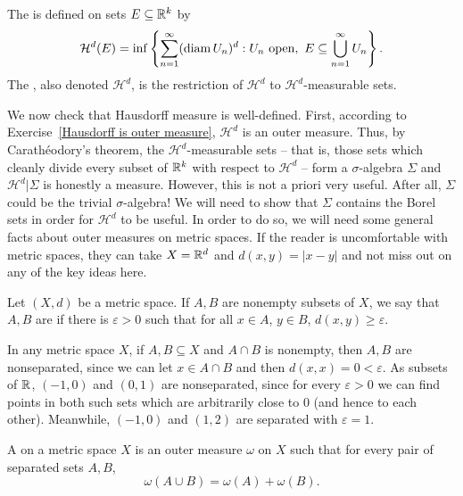 \begin{definition}
The  is defined on sets $E \subseteq \mathbb{R}^k$ by
$$\mathcal H^d(E) = \inf\left\{\sum_{n=1}^\infty (\operatorname{diam} U_{n})^d: U_{n}~\text{open},~E \subseteq \bigcup_{n=1}^\infty U_{n}\right\}.$$
The , also denoted $\mathcal H^d$, is the restriction of $\mathcal H^d$ to $\mathcal H^d$-measurable sets.
\end{definition}

\begin{subsec}
We now check that Hausdorff measure is well-defined.
First, according to Exercise~\ref{Hausdorff is outer measure}, $\mathcal H^d$ is an outer measure.
Thus, by Carathéodory's theorem, the $\mathcal H^d$-measurable sets -- that is, those sets which cleanly divide every subset of $\mathbb{R}^k$ with respect to $\mathcal H^d$ -- form a $\sigma$-algebra $\Sigma$ and $\mathcal H^d|\Sigma$ is honestly a measure.
However, this is not a priori very useful.
After all, $\Sigma$ could be the trivial $\sigma$-algebra!
We will need to show that $\Sigma$ contains the Borel sets in order for $\mathcal H^d$ to be useful.
In order to do so, we will need some general facts about outer measures on metric spaces.
If the reader is uncomfortable with metric spaces, they can take $X = \mathbb{R}^d$ and $d(x, y) = |x - y|$ and not miss out on any of the key ideas here.
\end{subsec}

\begin{definition}
Let $(X, d)$ be a metric space.
If $A, B$ are nonempty subsets of $X$, we say that $A,B$ are  if there is $\varepsilon > 0$ such that for all $x \in A$, $y \in B$, $d(x, y) \geq \varepsilon$.
\end{definition}

\begin{example}
In any metric space $X$, if $A,B \subseteq X$ and $A \cap B$ is nonempty, then $A,B$ are nonseparated, since we can let $x \in A \cap B$ and then $d(x, x) = 0 < \varepsilon$.
As subsets of $\mathbb{R}$, $(-1, 0)$ and $(0, 1)$ are nonseparated, since for every $\varepsilon > 0$ we can find points in both such sets which are arbitrarily close to $0$ (and hence to each other).
Meanwhile, $(-1, 0)$ and $(1, 2)$ are separated with $\varepsilon = 1$.
\end{example}

\begin{definition}
A  on a metric space $X$ is an outer measure $\omega$ on $X$ such that for every pair of separated sets $A,B$,
$$\omega(A \cup B) = \omega(A) + \omega(B).$$
\end{definition}

